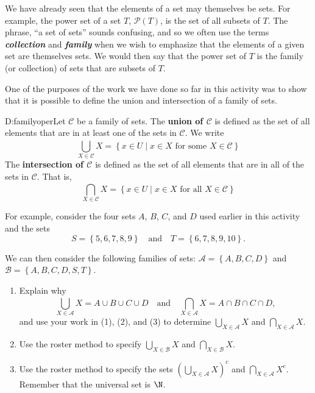 \begin{previewactivity}
We have already seen that the elements of a set may themselves be sets.  For example, the power set of a set $T$, $\mathcal{P}( T )$, is the set of all subsets of $T$.    The phrase, ``a set of sets'' sounds confusing, and so we often use the terms \textbf{\emph{collection}} and 
\textbf{\emph{family}}
%
 when we wish to emphasize that the elements of a given set are themselves sets.  We would then say that the power set of $T$ is the family (or collection) of sets that are subsets of $T$.

One of the purposes of the work we have done so far in this activity was to show that it is possible to define the union and intersection of a family of sets.

\begin{defbox}{D:familyoper}{Let $\mathcal{C}$ be a family of sets.  The \textbf{union of 
$\mathbf{\mathcal{C}}$}
%
%
 is defined as the set of all elements that are in at least one of the sets in $\mathcal{C}$.  We write
\[
\bigcup_{X \in \mathscr{C}}^{}X = \left\{x \in U \mid x \in X \text{ for some } X \in \mathscr{C} \right\} \label{sym:bigcup}
\]
The \textbf{intersection of $\mathbf{\mathcal{C}}$}
%
%
 is defined as the set of all elements that are in all of the sets in $\mathcal{C}$.  That is, 
\[
\bigcap_{X \in \mathscr{C}}^{}X = \left\{x \in U \mid x \in X \text{ for all } X \in \mathscr{C} \right\} \label{sym:bigcap}
\]
}
\end{defbox}

\noindent
For example, consider the four sets $A$, $B$, $C$, and $D$ used earlier in this activity and the sets
\[
S = \left\{5, 6, 7, 8, 9 \right\} \quad \text{and} \quad T = \left\{6, 7, 8, 9, 10 \right\}.
\]

\noindent
We can then consider the following families of sets:  
$\mathscr{A} = \left\{A, B, C , D \right\}$  and  \linebreak
$\mathscr{B} = \left\{A, B, C , D, S, T \right\}$.


\setcounter{oldenumi}{\theenumi}
\begin{enumerate} \setcounter{enumi}{\theoldenumi}
\item Explain why 
\[
\bigcup_{X \in \mathscr{A}}^{}X = A \cup B \cup C \cup D \quad \text{and} \quad
\bigcap_{X \in \mathscr{A}}^{}X = A \cap B \cap C \cap D,
\]
and use your work in (1), (2), and (3) to determine 
$\bigcup\limits_{X \in \mathscr{A}}^{}X$ and $\bigcap\limits_{X \in \mathscr{A}}^{}X$\!.

\item Use the roster method to specify
$\bigcup\limits_{X \in \mathscr{B}}^{}X$ and   $\bigcap\limits_{X \in \mathscr{B}}^{}X$\!.

\item Use the roster method to specify the sets 
$\left( \bigcup\limits_{X \in \mathscr{A}}^{}X \right)^c$ and $\bigcap\limits_{X \in \mathscr{A}}^{}X^c$\!.  Remember that the universal set is $\N$.
\end{enumerate}
\end{previewactivity}
\hbreak

\endinput
